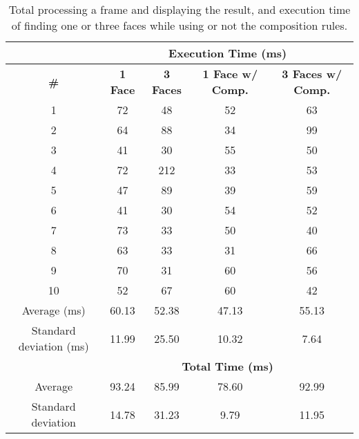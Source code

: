 \begin{table}[h]
	\footnotesize
    \begin{center}	
    \begin{tabular}{c c c c c}
    \hline 
    & \multicolumn{4}{c}{\textbf{Execution Time (ms)}}\\
    \hline
    \textbf{\#} & \textbf{1 Face} & \textbf{3 Faces} & \textbf{1 Face w/ Comp.} & \textbf{3 Faces w/ Comp.}\\
	\hline    
1&	72&	48&	52&	63\\
2&	64&	88&	34&	99\\
3&	41&	30&	55&	50\\
4&	72&	212&	33&	53\\
5&	47&	89&	39&	59\\
6&	41&	30&	54&	52\\
7&	73&	33&	50&	40\\
8&	63&	33&	31&	66\\
9&	70&	31&	60&	56\\
10&	52&	67&	60&	42\\

	\hline
	Average (ms) &	60.13 & 52.38 & 47.13 & 55.13\\
	Standard deviation (ms) & 11.99 & 25.50 & 10.32 & 7.64\\
	\hline
    &\multicolumn{4}{c}{\textbf{Total Time (ms)}}\\
    \hline
	Average&	93.24&	85.99&	78.60&	92.99\\
	Standard deviation&	14.78&	31.23&	9.79&	11.95\\
	\hline
    \end{tabular}
	\end{center}
    \caption{Total processing a frame and displaying the result, and execution time of finding one or three faces while using or not the composition rules.}
    \label{tab:face}
\end{table}

